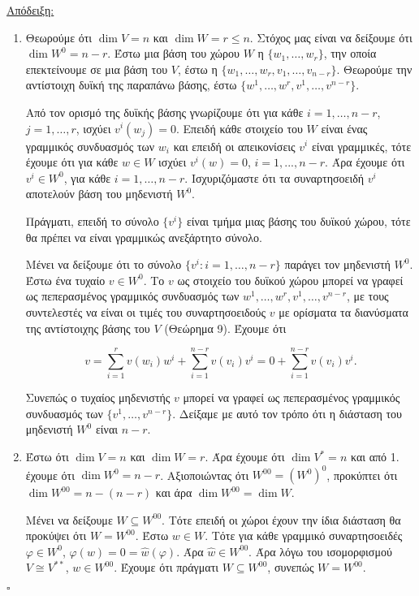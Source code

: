 \documentclass[12pt, a4paper]{book}
\begin{document}
\underline{Απόδειξη: }
\begin{enumerate}
\item Θεωρούμε ότι $\dim{V} = n$ και $\dim{W}=r \leq n$. Στόχος μας είναι να δείξουμε ότι $\dim{W^0} = n - r$. Έστω μια βάση του χώρου $W$ η $\{w_1,…,w_r\}$, την οποία επεκτείνουμε σε μια βάση του $V$, έστω η $\{w_1,…,w_r, v_1,…,v_{n-r}\}$. Θεωρούμε την αντίστοιχη δυϊκή της παραπάνω βάσης, έστω $\{w^1,…,w^r, v^1,…,v^{n-r}\}$.

Από τον ορισμό της δυϊκής βάσης γνωρίζουμε ότι για κάθε $i = 1,…,n-r$,\\ $j = 1,…,r$, ισχύει $v^i(w_j) = 0$. Επειδή κάθε στοιχείο του $W$ είναι ένας γραμμικός συνδυασμός των $w_i$ και επειδή οι απεικονίσεις $v^i$ είναι γραμμικές, τότε έχουμε ότι για κάθε $w \in W$ ισχύει $v^i(w) = 0$, $i=1,...,n-r$. Άρα έχουμε ότι $v^i \in W^0$, για κάθε $i = 1,…,n-r$. Ισχυριζόμαστε ότι τα συναρτησοειδή $v^i$ αποτελούν βάση του μηδενιστή $W^0$.

Πράγματι, επειδή το σύνολο $\{v^i\}$ είναι τμήμα μιας βάσης του δυϊκού χώρου, τότε θα πρέπει να είναι γραμμικώς ανεξάρτητο σύνολο. 

Μένει να δείξουμε ότι το σύνολο $\{v^i: i = 1,…,n-r\}$ παράγει τον μηδενιστή $W^0$. Έστω ένα τυχαίο $v \in W^0$. Το $v$ ως στοιχείο του δυϊκού χώρου μπορεί να γραφεί ως πεπερασμένος γραμμικός συνδυασμός των $w^1,…,w^r, v^1,…,v^{n-r}$, με τους συντελεστές να είναι οι τιμές του συναρτησοειδούς $v$ με ορίσματα τα διανύσματα της αντίστοιχης βάσης του $V$ (Θεώρημα 9). Έχουμε ότι

\begin{displaymath}
v = \sum_{i=1}^rv(w_i)w^i + \sum_{i=1}^{n-r}v(v_i)v^i = 0 + \sum_{i=1}^{n-r}v(v_i)v^i.
\end{displaymath}

Συνεπώς ο τυχαίος μηδενιστής $v$ μπορεί να γραφεί ως πεπερασμένος γραμμικός συνδυασμός των $\{v^1,…,v^{n-r}\}$. Δείξαμε με αυτό τον τρόπο ότι η διάσταση του μηδενιστή $W^0$ είναι $n-r$.
\item Έστω ότι $\dim{V} = n$ και $\dim{W} = r$. Άρα έχουμε ότι $\dim{V^*} = n$ και από 1. έχουμε ότι $\dim{W^0} = n - r$. Αξιοποιώντας ότι $W^{00} = (W^0)^0$, προκύπτει ότι $\dim{W^{00}} = n - (n - r)$ και άρα $\dim{W^{00}} = \dim{W}$.

Μένει να δείξουμε $W \subseteq W^{00}$. Τότε επειδή οι χώροι έχουν την ίδια διάσταση θα προκύψει ότι $W = W^{00}$. Έστω $w \in W$. Τότε για κάθε γραμμικό συναρτησοειδές $φ \in W^0$, $φ(w) = 0 = \widehat{w}(φ)$. Άρα $\widehat{w} \in W^{00}$. Άρα λόγω του ισομορφισμού $V \cong V^{**}$, $w \in W^{00}$. Έχουμε ότι πράγματι $W \subseteq W^{00}$, συνεπώς $W = W^{00}$.
\end{enumerate}
  \begin{flushright}
  $\square$
  \end{flushright} 
\end{document}

